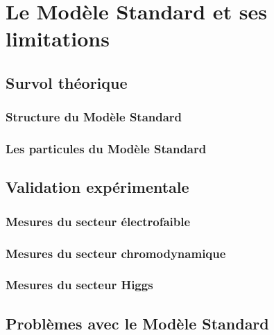 \section{Le Modèle Standard et ses limitations}
\label{sec:ms}

\subsection{Survol théorique}
\label{sec:ms:th}

\subsubsection{Structure du Modèle Standard}
\label{sec:ms:th:struct}

\subsubsection{Les particules du Modèle Standard}
\label{sec:ms:th:particules}

\subsection{Validation expérimentale}
\label{sec:ms:exp}

\subsubsection{Mesures du secteur électrofaible}
\label{sec:ms:exp:ewk}

\subsubsection{Mesures du secteur chromodynamique}
\label{sec:ms:exp:qcd}

\subsubsection{Mesures du secteur Higgs}
\label{sec:ms:exp:higgs}

\subsection{Problèmes avec le Modèle Standard}
\label{sec:ms:problemes}

\blindtext